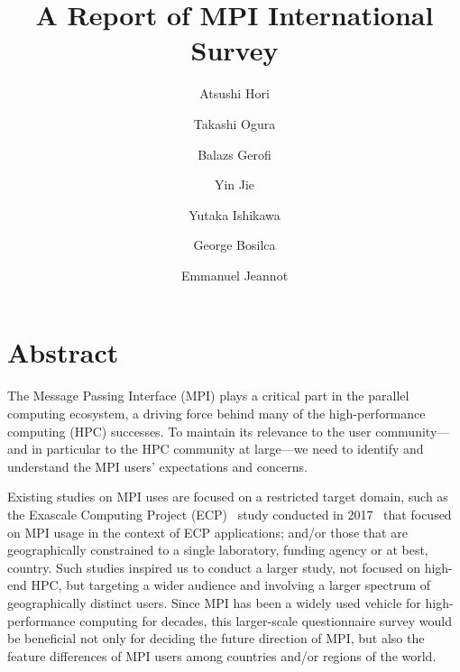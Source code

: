 \documentclass[sigconf,nonacm]{acmart}
\begin{document}
\title{A Report of MPI International Survey}

\author{Atsushi Hori}
\author{Takashi Ogura}
\author{Balazs Gerofi}
\author{Yin Jie}
\author{Yutaka Ishikawa}

\author{George Bosilca}

\author{Emmanuel Jeannot}

\maketitle

\section{Abstract}

The Message Passing Interface (MPI) plays a critical part in the
parallel computing 
ecosystem, a driving force behind many of the high-performance
computing (HPC) successes. To maintain its relevance to the user
community---and in particular to the HPC community at large---we need
to identify and understand the MPI users' expectations and concerns. 

%
Existing studies on MPI uses are focused on a restricted target domain,
such as the Exascale Computing Project (ECP)~\cite{ECP} study
conducted in 2017~\cite{osti_1462877} that focused 
on MPI usage in the context of ECP applications; and/or those that are
geographically 
constrained to a single laboratory, funding agency or at best, country.
%
Such studies inspired us to conduct a larger study, not focused on
high-end HPC, but
targeting a wider audience and involving a larger spectrum of geographically
distinct users. Since MPI has been a widely used vehicle for high-performance
computing for decades, this larger-scale questionnaire survey would be
beneficial not only for deciding the future direction of MPI, but also the
feature differences of MPI users among countries and/or regions of the world.
\end{document}

